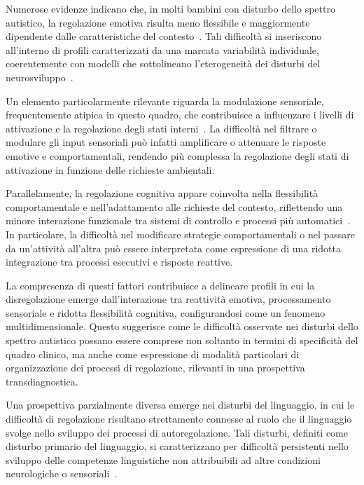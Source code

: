             Numerose evidenze indicano che, in molti bambini con disturbo dello spettro autistico, la regolazione emotiva risulta meno flessibile e maggiormente dipendente dalle caratteristiche del contesto~\cite{eisenberg2010,beauchaine2019,mazefsky2013}. Tali difficoltà si inseriscono all'interno di profili caratterizzati da una marcata variabilità individuale, coerentemente con modelli che sottolineano l'eterogeneità dei disturbi del neurosviluppo~\cite{astle2022}.

            Un elemento particolarmente rilevante riguarda la modulazione sensoriale, frequentemente atipica in questo quadro, che contribuisce a influenzare i livelli di attivazione e la regolazione degli stati interni~\cite{beauchaine2019,mazefsky2013}. La difficoltà nel filtrare o modulare gli input sensoriali può infatti amplificare o attenuare le risposte emotive e comportamentali, rendendo più complessa la regolazione degli stati di attivazione in funzione delle richieste ambientali.

            Parallelamente, la regolazione cognitiva appare coinvolta nella flessibilità comportamentale e nell'adattamento alle richieste del contesto, riflettendo una minore interazione funzionale tra sistemi di controllo e processi più automatici~\cite{diamond2013,zelazo2020,samson2014}. In particolare, la difficoltà nel modificare strategie comportamentali o nel passare da un'attività all'altra può essere interpretata come espressione di una ridotta integrazione tra processi esecutivi e risposte reattive.

            La compresenza di questi fattori contribuisce a delineare profili in cui la disregolazione emerge dall'interazione tra reattività emotiva, processamento sensoriale e ridotta flessibilità cognitiva, configurandosi come un fenomeno multidimensionale. Questo suggerisce come le difficoltà osservate nei disturbi dello spettro autistico possano essere comprese non soltanto in termini di specificità del quadro clinico, ma anche come espressione di modalità particolari di organizzazione dei processi di regolazione, rilevanti in una prospettiva transdiagnostica.

            Una prospettiva parzialmente diversa emerge nei disturbi del linguaggio, in cui le difficoltà di regolazione risultano strettamente connesse al ruolo che il linguaggio svolge nello sviluppo dei processi di autoregolazione. Tali disturbi, definiti come disturbo primario del linguaggio, si caratterizzano per difficoltà persistenti nello sviluppo delle competenze linguistiche non attribuibili ad altre condizioni neurologiche o sensoriali~\cite{bishop2017}.

